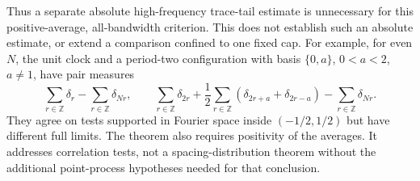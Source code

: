 Thus a separate absolute high-frequency trace-tail estimate is unnecessary
for this positive-average, all-bandwidth criterion. This does not establish
such an absolute estimate, or extend a comparison confined to one fixed cap.
For example, for even $N$, the unit clock and a period-two configuration with
basis $\{0,a\}$, $0<a<2$, $a\ne1$, have pair measures
\[
 \sum_{r\in\mathbb Z}\delta_r-\sum_{r\in\mathbb Z}\delta_{Nr},
 \qquad
 \sum_{r\in\mathbb Z}\delta_{2r}
 +\frac12\sum_{r\in\mathbb Z}(\delta_{2r+a}+\delta_{2r-a})
 -\sum_{r\in\mathbb Z}\delta_{Nr}.
\]
They agree on tests supported in Fourier space inside $(-1/2,1/2)$ but
have different full limits. The theorem also requires positivity of the
averages. It addresses correlation tests, not a spacing-distribution theorem
without the additional point-process hypotheses needed for that conclusion.
